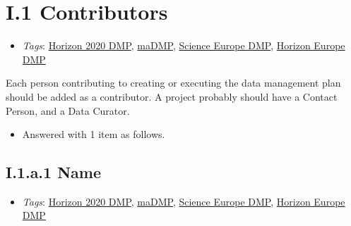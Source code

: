 \documentclass[a4paper,12pt]{report}
\begin{document}
\section*{\protect\textcolor{colorSecId}{I.1} Contributors}

\label{1e85da40-bbfc-4180-903e-6c569ed2da38.73d686bd-7939-412e-8631-502ee6d9ea7b}


\begin{itemize}
  \item \textit{Tags}: \ul{Horizon 2020 DMP}, \ul{maDMP}, \ul{Science Europe DMP}, \ul{Horizon Europe DMP}
  \end{itemize}


\noindent
\begin{markdown}
Each person contributing to creating or executing the data management plan should be added as a contributor. A project probably should have a Contact Person, and a Data Curator.
\end{markdown}


\begin{itemize}
  \item[\ArrowBoldDownRight] Answered with 1 item as follows.
\end{itemize}%
\subsection*{\protect\textcolor{colorSecId}{I.1.a.1} Name}

\label{1e85da40-bbfc-4180-903e-6c569ed2da38.73d686bd-7939-412e-8631-502ee6d9ea7b.e8be8cc6-d323-4b94-8895-68b998582dbf.6155ad47-3d1e-4488-9f2a-742de1e56580}


\begin{itemize}
  \item \textit{Tags}: \ul{Horizon 2020 DMP}, \ul{maDMP}, \ul{Science Europe DMP}, \ul{Horizon Europe DMP}
  \end{itemize}
\end{document}
